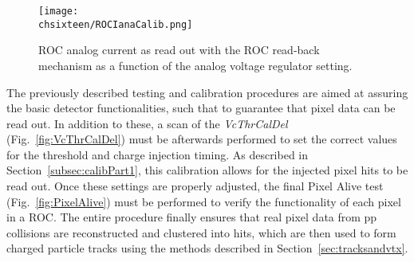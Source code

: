 \begin{figure}[!htb]
 \begin{center}
  \texttt{[image: \\chsixteen/ROCIanaCalib.png]}
 \end{center}
 \caption{ROC analog current as read out with the ROC read-back mechanism as a function of the analog voltage regulator setting.}
 \label{fig:ROCIanaCalib}
\end{figure} 

The previously described testing and calibration procedures are aimed at assuring the basic detector functionalities, such that to guarantee that pixel data can be read out. In addition to these, a scan of the \textit{VcThrCalDel} (Fig.~\ref{fig:VcThrCalDel}) must be afterwards performed to set the correct values for the threshold and charge injection timing. As described in Section~\ref{subsec:calibPart1}, this calibration allows for the injected pixel hits to be read out. Once these settings are properly adjusted, the final Pixel Alive test (Fig.~\ref{fig:PixelAlive}) must be performed to verify the functionality of each pixel in a ROC. The entire procedure finally ensures that real pixel data from pp collisions are reconstructed and clustered into hits, which are then used to form charged particle tracks using the methods described in Section~\ref{sec:tracksandvtx}.
